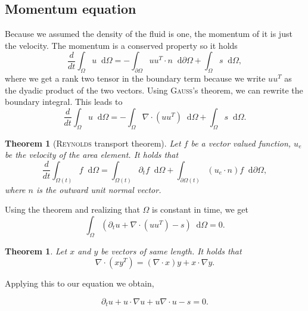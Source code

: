 \documentclass[12pt,a4paper,twoside, open=right]{scrreprt}
\theoremstyle{definition}
\theoremstyle{plain}
\newtheorem{sa}[auf]{Theorem}
\newcommand{\D}{\mathop{}\!\mathrm{d}}
\begin{document}
\subsection{Momentum equation}
Because we assumed the density of the fluid is one, the momentum of it is just the velocity. The momentum is a conserved property so it holds
\begin{equation}
    \frac{d}{dt}\int_\Omega u\D\Omega = -\int_{\partial\Omega}uu^T\cdot n\D\partial\Omega +\int_\Omega s\D\Omega,
\end{equation} where we get a rank two tensor in the boundary term because we write $uu^T$ as the dyadic product of the two vectors. Using \textsc{Gauß}'s theorem, we can rewrite the boundary integral. This leads to 
\begin{equation}
    \frac{d}{dt}\int_\Omega u\D\Omega = -\int_\Omega \nabla\cdot(uu^T)\D\Omega +\int_\Omega s\D\Omega.
\end{equation}

\begin{sa}[\textsc{Reynolds} transport theorem]
    Let $f$ be a vector valued function, $u_e$ be the velocity of the area element. It holds that
    \begin{equation}
        \frac{d}{dt}\int_{\Omega(t)}f\D \Omega =\int_{\Omega(t)}\partial_t f\D \Omega+\int_{\partial\Omega(t)}(u_e\cdot n)f\D \partial \Omega,
    \end{equation}
    where $n$ is the outward unit normal vector.
\end{sa}
Using the theorem and realizing that $\Omega$ is constant in time, we get
\begin{equation}
    \int_\Omega (\partial_t u +\nabla\cdot(uu^T)-s)\D\Omega =0.
\end{equation}
\begin{sa}
    Let $x$ and $y$ be vectors of same length. It holds that
    \begin{equation}
    \nabla\cdot(xy^T)=(\nabla\cdot x)y+x\cdot\nabla y.
    \end{equation}
\end{sa}
Applying this to our equation we obtain,

\begin{equation}
    \partial_t u +u\cdot\nabla u+u\nabla\cdot u - s = 0.
\end{equation}
\end{document}
